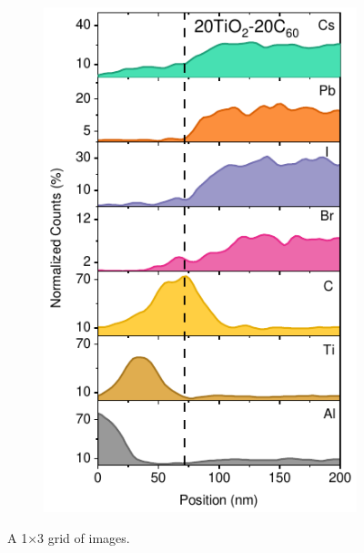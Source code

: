 \begin{figure}[htbp]
\begin{subfigure}{0.32\textwidth}
        \includegraphics[width=\textwidth]{chapters/transport_layers/images/TEM_20_20.pdf}
        \caption{}
        \label{}
    \end{subfigure}
    
    \caption{A 1×3 grid of images.}
    \label{}
\end{figure}



